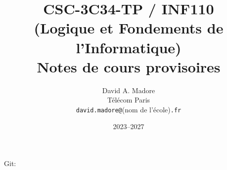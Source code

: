 \documentclass[12pt,a4paper]{article}
\theoremstyle{definition}
\begin{document}
\title{CSC-3C34-TP / INF110\\
(Logique et Fondements de l'Informatique)
\\\footnotesize Notes de cours provisoires}
\author{David A. Madore\\
{\footnotesize Télécom Paris}\\
\texttt{david.madore@}(nom de l'école)\texttt{.fr}}
\date{2023–2027}
\maketitle
{\footnotesize{}\par}
{\tiny
\immediate{}
\begin{center}
Git: 
\end{center}
\immediate{}
\par}








%
%
%

\printindex



%
%
%
\end{document}
